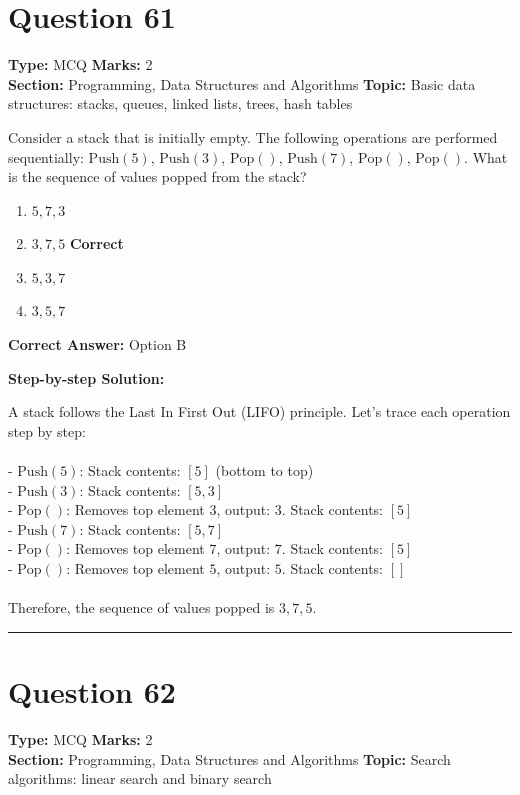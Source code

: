 \documentclass[11pt]{article}
\begin{document}
\section*{Question 61}
\textbf{Type:} MCQ \hfill \textbf{Marks:} 2\\
\textbf{Section:} Programming, Data Structures and Algorithms \hfill \textbf{Topic:} Basic data structures: stacks, queues, linked lists, trees, hash tables

Consider a stack that is initially empty. The following operations are performed sequentially: \(\text{Push}(5)\), \(\text{Push}(3)\), \(\text{Pop}()\), \(\text{Push}(7)\), \(\text{Pop}()\), \(\text{Pop}()\). What is the sequence of values popped from the stack?


\begin{enumerate}[label=\textbf{\Alph*.}, leftmargin=1.8em]
\item \(5, 7, 3\)\item \(3, 7, 5\) \hfill {\color{gategreen}\textbf{Correct}}\item \(5, 3, 7\)\item \(3, 5, 7\)\end{enumerate}

\textbf{Correct Answer:} Option B

\textbf{Step-by-step Solution:}

A stack follows the Last In First Out (LIFO) principle. Let's trace each operation step by step:\\
\\
- \(\text{Push}(5)\): Stack contents: \([5]\) (bottom to top)\\
- \(\text{Push}(3)\): Stack contents: \([5, 3]\)\\
- \(\text{Pop}()\): Removes top element \(3\), output: \(3\). Stack contents: \([5]\)\\
- \(\text{Push}(7)\): Stack contents: \([5, 7]\)\\
- \(\text{Pop}()\): Removes top element \(7\), output: \(7\). Stack contents: \([5]\)\\
- \(\text{Pop}()\): Removes top element \(5\), output: \(5\). Stack contents: \([]\)\\
\\
Therefore, the sequence of values popped is \(3, 7, 5\).

\vspace{0.8em}
\hrule
\vspace{0.4em}
\section*{Question 62}
\textbf{Type:} MCQ \hfill \textbf{Marks:} 2\\
\textbf{Section:} Programming, Data Structures and Algorithms \hfill \textbf{Topic:} Search algorithms: linear search and binary search
\end{document}
